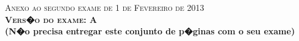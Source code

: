 \documentclass{docist}
\begin{document}
\thispagestyle{empty}

\begin{center}
  {\Large \textsc{Anexo ao segundo exame de 1 de Fevereiro de 2013\\[2ex]
      \textbf{Vers�o do exame: A}\\[2ex]}}
  {\normalsize  \textbf{(N�o precisa entregar este conjunto de p�ginas com o seu exame)}}
\end{center}




\wikipediaWarning

\qGHCBlockLayer

\qGHCBlockLayerQualities

\qGHCRewriteRules

\qGHCAsLibrary

\qGHCCodeGeneration

\qZeroMQScaleMulticore

\qZeroMQBroker

\qZeroMQAsLibrary

\qZeroMQExtensibleEngines

\qZeroMQBSDSockets

\qnginxProcesses

\qnginxCaching

\qnginxWorkers

\qnginxWorkerParallel

\qnginxCTenKProblem

\qWebCacheModule

\qWebCacheGlobal

\qWebDistributedCache

\qWebMissingCacheNode

\qDomainLogicFenix

\qPerformance

\qMemcachedModules

\qSubcontractors

\qAspects

\qSOA

\qAvailability

\qSecurity

\qWebEvolution

\qTiers

\qArqEmailMUAMTA
\end{document}

